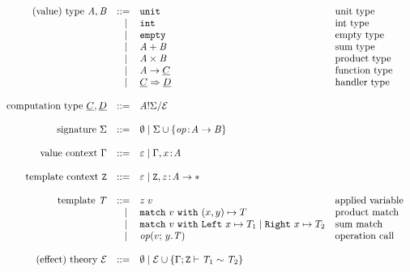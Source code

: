 
\[
	\begin{array}{rrll}
		\text{(value) type}~\tyA, \tyB
		 & ::=   & \unittype          				& \text{unit type}			\\
		 & \vsep & \inttype         					& \text{int type}				\\
		 & \vsep & \emptytype         				& \text{empty type}			\\
		 & \vsep & \sumtype{\tyA}{\tyB}   		& \text{sum type}				\\
		 & \vsep & \producttype{\tyA}{\tyB}   & \text{product type}		\\
		 & \vsep & \tyA \to \ctyC     				& \text{function type}	\\
		 & \vsep & \ctyC \hto \ctyD   				& \text{handler type}		\\
		\\
		\text{computation type}~\ctyC, \ctyD
		 & ::=   & \ctype{\tyA}{\sig}{\eqE} \\
		\\
		\text{signature}~\sig
		 & ::=   & \nil \vsep \sig \union \set{{\op \oftype \tyA \to \tyB}} \\
		\\
		\text{value context}~\ctx
		 & ::=   & \varepsilon \vsep \ctx, x \oftype \tyA \\
		\\
		\text{template context}~\tvars
		 & ::=   & \varepsilon \vsep \tvars, z \oftype \tyA \to \anytype \\
		\\
		\text{template}~\tmplT
		 & ::=   & \apply{z}{v} & \text{applied variable} 											\\
		 & \vsep & \match{v} \pair{x}{y} \mapsto T & \text{product match} 			\\
		 & \vsep & \match{v} 	\inleft{x} \mapsto T_1 
		 	 \vsep	 \inright{x} \mapsto T_2  & \text{sum match}		 							\\
		 & \vsep & \operation{v}{y.\tmplT} & \text{operation call} 							\\
		\\
		\text{(effect) theory}~\eqE
		 & ::=   & \nil \vsep \eqE \union
							 \set{\teqjudgement{\tenv}{\tmplT_1 \rel \tmplT_2}} \\
	\end{array}
\]
